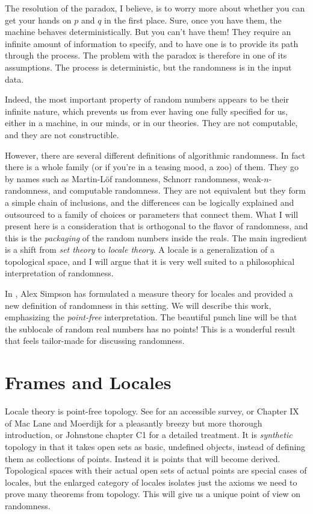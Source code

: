 \documentclass[12pt]{extarticle}
\begin{document}
The resolution of the paradox, I believe, is to worry more about whether you can get your hands on $p$ and $q$ in the first place. Sure, once you have them, the machine behaves deterministically. But you can't have them! They require an infinite amount of information to specify, and to have one is to provide its path through the process. The problem with the paradox is therefore in one of its assumptions. The process is deterministic, but the randomness is in the input data.

Indeed, the most important property of random numbers appears to be their infinite nature, which prevents us from ever having one fully specified for us, either in a machine, in our minds, or in our theories. They are not computable, and they are not constructible.

However, there are several different definitions of algorithmic randomness. In fact there is a whole family (or if you're in a teasing mood, a zoo) of them. They go by names such as Martin-Löf randomness, Schnorr randomness, weak-$n$-randomness, and computable randomness. They are not equivalent but they form a simple chain of inclusions, and the differences can be logically explained and outsourced to a family of choices or parameters that connect them. What I will present here is a consideration that is orthogonal to the flavor of randomness, and this is the \emph{packaging} of the random numbers inside the reals. The main ingredient is a shift from \emph{set theory} to \emph{locale theory}. A locale is a generalization of a topological space, and I will argue that it is very well suited to a philosophical interpretation of randomness.

In \cite{simpson}, Alex Simpson has formulated a measure theory for locales and provided a new definition of randomness in this setting. We will describe this work, emphasizing the \emph{point-free} interpretation. The beautiful punch line will be that the sublocale of random real numbers has no points! This is a wonderful result that feels tailor-made for discussing randomness. 

\section{Frames and Locales}

Locale theory is point-free topology. See \cite{johnstone1983} for an accessible survey, or Chapter IX of Mac Lane and Moerdijk \cite{maclane} for a pleasantly breezy but more thorough introduction, or Johnstone \cite{sketches} chapter C1 for a detailed treatment. It is \emph{synthetic} topology in that it takes open sets as basic, undefined objects, instead of defining them as collections of points. Instead it is points that will become derived. Topological spaces with their actual open sets of actual points are special cases of locales, but the enlarged category of locales isolates just the axioms we need to prove many theorems from topology. This will give us a unique point of view on randomness.
\end{document}
